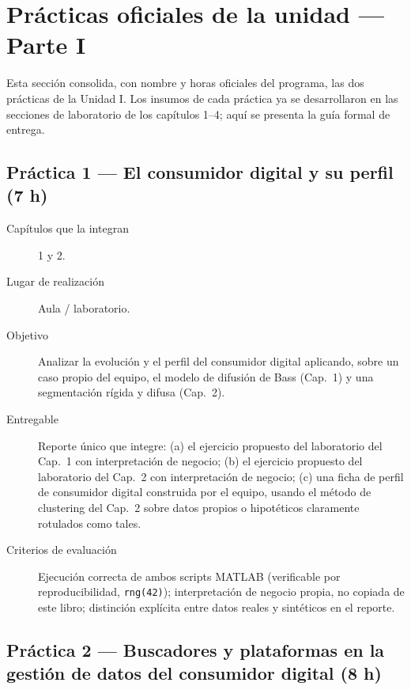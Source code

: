 \chapter*{Prácticas oficiales de la unidad — Parte I}

Esta sección consolida, con nombre y horas oficiales del programa, las dos
prácticas de la Unidad I. Los insumos de cada práctica ya se desarrollaron
en las secciones de laboratorio de los capítulos 1--4; aquí se presenta la
guía formal de entrega.

\section*{Práctica 1 — El consumidor digital y su perfil (7 h)}

\begin{description}
  \item[Capítulos que la integran] 1 y 2.
  \item[Lugar de realización] Aula / laboratorio.
  \item[Objetivo] Analizar la evolución y el perfil del consumidor digital
  aplicando, sobre un caso propio del equipo, el modelo de difusión de Bass
  (Cap.~1) y una segmentación rígida y difusa (Cap.~2).
  \item[Entregable] Reporte único que integre: (a) el ejercicio propuesto del
  laboratorio del Cap.~1 con interpretación de negocio; (b) el ejercicio
  propuesto del laboratorio del Cap.~2 con interpretación de negocio; (c) una
  ficha de perfil de consumidor digital construida por el equipo, usando el
  método de clustering del Cap.~2 sobre datos propios o hipotéticos
  claramente rotulados como tales.
  \item[Criterios de evaluación] Ejecución correcta de ambos scripts MATLAB
  (verificable por reproducibilidad, \texttt{rng(42)}); interpretación de
  negocio propia, no copiada de este libro; distinción explícita entre datos
  reales y sintéticos en el reporte.
\end{description}

\section*{Práctica 2 — Buscadores y plataformas en la gestión de datos del consumidor digital (8 h)}

